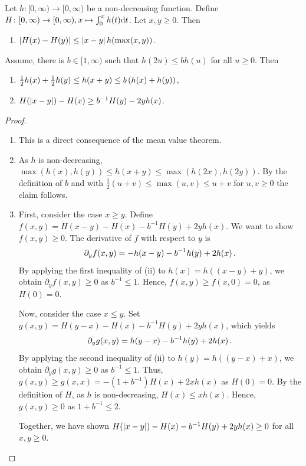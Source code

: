 \begin{lemma}\label{lmm:nondec}
Let $h \colon [0,\infty) \to [0,\infty)$ be a non-decreasing function.
Define $H \colon [0,\infty) \to [0,\infty), x\mapsto \int_0^x h(t) \mathrm{d} t$.
Let $x, y \geq 0$. Then
\begin{enumerate}[label=(\roman*)]
\item $\left| H(x) - H(y) \right| \leq \left| x-y \right|h(\max(x, y))$.
\end{enumerate}
Assume, there is $b \in [1,\infty)$ such that $h(2u) \leq b h(u)$ for all $u \geq 0$. Then
\begin{enumerate}[label=(\roman*),start=2]
\item $\frac12 h(x) + \frac12 h(y) \leq h (x+y) \leq b \left( h(x) + h(y) \right)$,
\item $H(\left| x-y \right|) - H(x) \geq b^{-1} H(y) - 2 y h(x)$.
\end{enumerate}
\end{lemma}
%
\begin{proof}
\begin{enumerate}[label=(\roman*)]
\item This is a direct consequence of the mean value theorem.
\item As $h$ is non-decreasing, $\max(h(x), h(y)) \leq h(x+y) \leq \max(h(2x), h(2y))$.
	By the definition of $b$ and with $\frac12(u+v) \leq \max(u,v) \leq u+v$ for $u,v \geq 0$ the claim follows.
\item 
	First, consider the case $x\geq y$.
 	Define $f(x,y) = H(x-y)-H(x)- b^{-1} H(y) + 2 y h(x)$.
 	We want to show $f(x, y)\geq0$.
	The derivative of $f$ with respect to $y$ is 
	\begin{equation*}
		\partial_y f(x, y) = -h(x-y) - b^{-1}h(y) + 2 h(x)\, .
	\end{equation*} 
	By applying the first inequality of (ii) to $h(x) = h((x-y) + y)$, we obtain $\partial_y f(x, y)  \geq 0$ as $b^{-1} \leq 1$.
	Hence, $f(x, y) \geq f(x, 0) = 0$, as $H(0) = 0$.
	
	Now, consider the case $x \leq y$. Set $g(x,y) = H(y-x) - H(x) - b^{-1} H(y) + 2 y h(x)$, which yields
	\begin{equation*}
		\partial_y g(x, y) = h(y-x) - b^{-1} h(y) + 2 h(x)\, .
	\end{equation*} 
	By applying the second inequality of (ii) to $h(y) = h((y-x) + x)$, we obtain $\partial_y g(x, y)  \geq 0$ as $b^{-1} \leq 1$.
	Thus, $g(x, y) \geq g(x, x) = -(1 + b^{-1}) H(x) + 2 x h(x)$ as $H(0) = 0$.
	By the definition of $H$, as $h$ is non-decreasing, $H(x) \leq x h(x)$. Hence, $g(x, y) \geq 0$ as $1 + b^{-1} \leq 2$.

	Together, we have shown $H(\left| x-y \right|) - H(x) - b^{-1} H(y) + 2 y h(x) \geq 0$ for all $x,y\geq0$.
\end{enumerate}
\end{proof}
